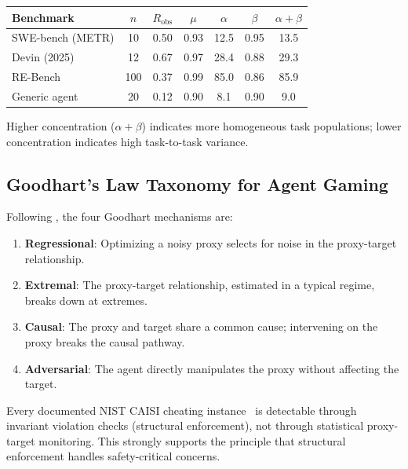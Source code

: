 \documentclass[11pt, a4paper, copyright]{googledeepmind}
\begin{document}
\begin{appendices}
\begin{center}
\begin{tabular}{lcccccc}
\toprule
Benchmark & $n$ & $R_{\text{obs}}$ & $\mu$ & $\alpha$ & $\beta$ & $\alpha{+}\beta$ \\
\midrule
SWE-bench (METR) & 10 & 0.50 & 0.93 & 12.5 & 0.95 & 13.5 \\
Devin (2025) & 12 & 0.67 & 0.97 & 28.4 & 0.88 & 29.3 \\
RE-Bench & 100 & 0.37 & 0.99 & 85.0 & 0.86 & 85.9 \\
Generic agent & 20 & 0.12 & 0.90 & 8.1 & 0.90 & 9.0 \\
\bottomrule
\end{tabular}
\end{center}

Higher concentration ($\alpha + \beta$) indicates more homogeneous task populations; lower concentration indicates high task-to-task variance.

\subsection{Goodhart's Law Taxonomy for Agent Gaming}

Following \citet{manheim2019goodhart}, the four Goodhart mechanisms are:

\begin{enumerate}
\item \textbf{Regressional}: Optimizing a noisy proxy selects for noise in the proxy-target relationship.
\item \textbf{Extremal}: The proxy-target relationship, estimated in a typical regime, breaks down at extremes.
\item \textbf{Causal}: The proxy and target share a common cause; intervening on the proxy breaks the causal pathway.
\item \textbf{Adversarial}: The agent directly manipulates the proxy without affecting the target.
\end{enumerate}

Every documented NIST CAISI cheating instance~\citep{nist2025cheating} is detectable through invariant violation checks (structural enforcement), not through statistical proxy-target monitoring.
This strongly supports the principle that structural enforcement handles safety-critical concerns.

\end{appendices}


\end{document}
